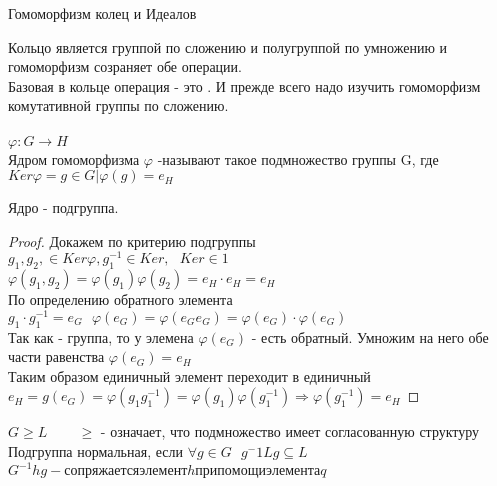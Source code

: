 \begin{title}
	Гомоморфизм колец и Идеалов
\end{title}

Кольцо является группой по сложению и полугруппой по умножению и гомоморфизм
созраняет обе операции. \\
Базовая в кольце операция - это . И прежде всего надо изучить
гомоморфизм комутативной группы по сложению.\\

\\
$\varphi:G \to H$\\
Ядром гомоморфизма $\varphi$ -называют такое подмножество группы G, где
$Ker \varphi = {g \in G|\varphi (g) = e_H}$ \\

\begin{defin}[Свойство 1]
	Ядро - подгруппа.
\end{defin}

\begin{proof}
	Докажем по критерию подгруппы\\
	$g_1, g_2, \in Ker\varphi, g^{-1}_1 \in Ker, ~~~ Ker \in 1$\\
	$\varphi(g_1, g_2) = \varphi(g_1) \varphi(g_2) = e_H \cdot e_H = e_H$\\
	По определению обратного элемента $g_1 \cdot g^{-1}_1 = e_G ~~~
	\varphi(e_G) = \varphi(e_G e_G) = \varphi(e_G) \cdot \varphi(e_G)$\\

	Так как  - группа, то у элемена $\varphi(e_G)$ - есть обратный. Умножим
	на него обе части равенства $\varphi(e_G) = e_H$\\
	Таким образом единичный элемент переходит в единичный\\
	$e_H = g(e_G) = \varphi(g_1 g^{-1}_1) = \varphi(g_1)\varphi(g^{-1}_1)
	\Rightarrow \varphi(g^{-1}_1) = e_H$
\end{proof}

\begin{defin}
	$G \ge L$ ~~~ $\ge$ - означает, что подмножество имеет согласованную
	структуру\\
	Подгруппа нормальная, если $\forall g \in G ~~~ g^-1 Lg \subseteq L$\\
	$G^{-1}hg - сопряжается элемент h при помощи элемента q$\\
\end{defin}

